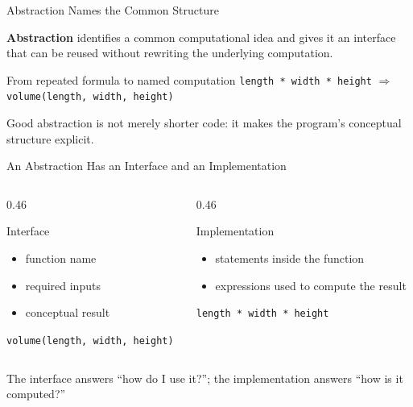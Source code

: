 \documentclass[aspectratio=169,10pt]{beamer}
\begin{document}
\begin{frame}{Abstraction Names the Common Structure}
  \begin{cpdefinition}
    \textbf{Abstraction} identifies a common computational idea and gives it an interface that can be reused without rewriting the underlying computation.
  \end{cpdefinition}

  \begin{block}{From repeated formula to named computation}
    \centering
    \texttt{length * width * height}
    \qquad$\Longrightarrow$\qquad
    \texttt{volume(length, width, height)}
  \end{block}

  \begin{keyidea}
    Good abstraction is not merely shorter code: it makes the program's conceptual structure explicit.
  \end{keyidea}
\end{frame}

\begin{frame}{An Abstraction Has an Interface and an Implementation}
  \begin{columns}[T,onlytextwidth]
    \begin{column}{0.46\textwidth}
      \begin{block}{Interface}
        \begin{itemize}
          \item function name
          \item required inputs
          \item conceptual result
        \end{itemize}
      \end{block}
      \begin{exampleblockcp}
        \texttt{volume(length, width, height)}
      \end{exampleblockcp}
    \end{column}

    \begin{column}{0.46\textwidth}
      \begin{block}{Implementation}
        \begin{itemize}
          \item statements inside the function
          \item expressions used to compute the result
        \end{itemize}
      \end{block}
      \begin{exampleblockcp}
        \texttt{length * width * height}
      \end{exampleblockcp}
    \end{column}
  \end{columns}

  \begin{keyidea}
    The interface answers ``how do I use it?''; the implementation answers ``how is it computed?''
  \end{keyidea}
\end{frame}
\end{document}
